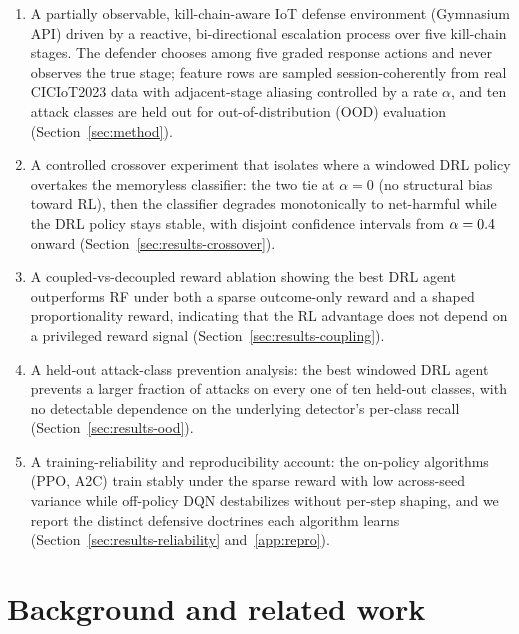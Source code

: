 \documentclass[3p,twocolumn]{elsarticle}
\begin{document}
\begin{enumerate}
\item A partially observable, kill-chain-aware IoT defense
environment (Gymnasium API) driven by a reactive, bi-directional escalation
process over five kill-chain stages. The defender chooses among five graded
response actions and never observes the true stage; feature rows are sampled
session-coherently from real CICIoT2023 data with adjacent-stage aliasing
controlled by a rate $\alpha$, and ten attack classes are held out for
out-of-distribution (OOD) evaluation (Section~\ref{sec:method}).

\item A controlled crossover experiment that isolates where a windowed
DRL policy overtakes the memoryless classifier: the two tie at $\alpha=0$
(no structural bias toward RL), then the classifier degrades monotonically to
net-harmful while the DRL policy stays stable, with disjoint confidence
intervals from $\alpha=0.4$ onward
(Section~\ref{sec:results-crossover}).

\item A coupled-vs-decoupled reward ablation showing the best DRL agent
outperforms RF under both a sparse outcome-only reward and a shaped
proportionality reward, indicating that the RL advantage does not depend on
a privileged reward signal (Section~\ref{sec:results-coupling}).

\item A held-out attack-class prevention analysis: the best windowed
DRL agent prevents a larger fraction of attacks on every one of ten
held-out classes, with no detectable dependence on the underlying
detector's per-class recall (Section~\ref{sec:results-ood}).

\item A training-reliability and reproducibility account: the on-policy
algorithms (PPO, A2C) train stably under the sparse reward with low across-seed
variance while off-policy DQN destabilizes without per-step shaping, and we
report the distinct defensive doctrines each algorithm learns
(Section~\ref{sec:results-reliability} and~\ref{app:repro}).
\end{enumerate}

\section{Background and related work}
\label{sec:related}
\end{document}
